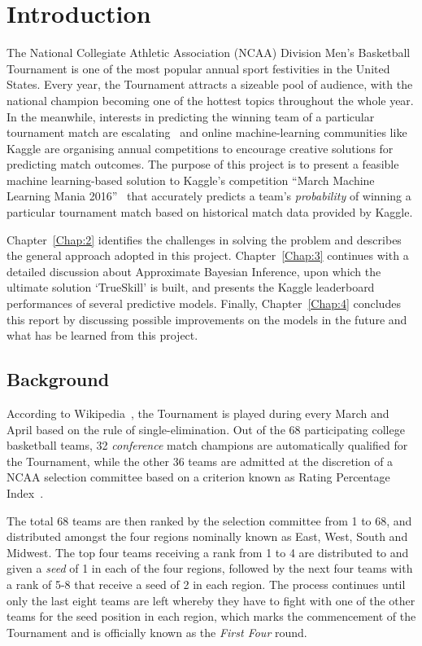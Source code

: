 \chapter{Introduction}
The National Collegiate Athletic Association (NCAA) Division  Men's Basketball Tournament is one of the most popular annual sport festivities in the United States. Every year, the Tournament attracts a sizeable pool of audience, with the national champion becoming one of the hottest topics throughout the whole year. In the meanwhile, interests in predicting the winning team of a particular tournament match are escalating~\cite{NP17} and online machine-learning communities like Kaggle are organising annual competitions to encourage creative solutions for predicting match outcomes. The purpose of this project is to present a feasible machine learning-based solution to Kaggle's competition ``March Machine Learning Mania 2016''~\cite{KG16} that accurately predicts a team's \emph{probability} of winning a particular tournament match based on historical match data provided by Kaggle. 

Chapter~\ref{Chap:2} identifies the challenges in solving the problem and describes the general approach adopted in this project. Chapter~\ref{Chap:3} continues with a detailed discussion about Approximate Bayesian Inference, upon which the ultimate solution `TrueSkill' is built, and presents the Kaggle leaderboard performances of several predictive models. Finally, Chapter~\ref{Chap:4} concludes this report by discussing possible improvements on the models in the future and what has be learned from this project. 

\section{Background}
According to Wikipedia~\cite{NCAA17}, the Tournament is played during every March and April based on the rule of single-elimination. Out of the 68 participating college basketball teams, 32 \emph{conference} match champions are automatically qualified for the Tournament, while the other 36 teams are admitted at the discretion of a NCAA selection committee based on a criterion known as Rating Percentage Index~\cite{WIK17}.

The total 68 teams are then ranked by the selection committee from 1 to 68, and distributed amongst the four regions nominally known as East, West, South and Midwest. The top four teams receiving a rank from 1 to 4 are distributed to and given a \emph{seed} of 1 in each of the four regions, followed by the next four teams with a rank of 5-8 that receive a seed of 2 in each region. The process continues until only the last eight teams are left whereby they have to fight with one of the other teams for the  seed position in each region, which marks the commencement of the Tournament and is officially known as the \emph{First Four} round. 

